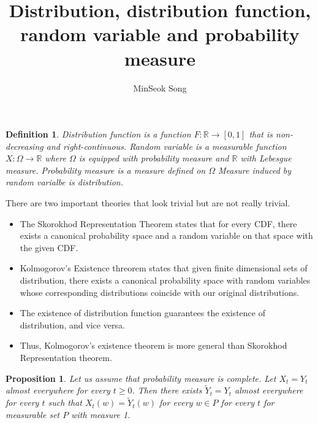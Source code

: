 \documentclass{article}
\title{Distribution, distribution function, random variable and probability measure}
\author{MinSeok Song}
\date{}
\newtheorem{proposition}[theorem]{Proposition}
\newtheorem{definition}{Definition}
\theoremstyle{remark}
\begin{document}
\maketitle
\begin{definition}
    Distribution function is a function $F:\mathbb{R}\to [0,1]$ that is non-decreasing and right-continuous.
    Random variable is a measurable function $X:\Omega\to\mathbb{R}$ where $\Omega$ is equipped with probability measure and $\mathbb{R}$ with Lebesgue measure.
    Probability measure is a measure defined on $\Omega$
    Measure induced by random varialbe is distribution. 
\end{definition}
There are two important theories that look trivial but are not really trivial.
\begin{itemize}
\item The Skorokhod Representation Theorem 
    states that for every CDF, there exists a canonical probability space and a random variable on that space with the given CDF.\\
\item Kolmogorov's Existence threorem states that given finite dimensional sets of distribution, there exists a canonical probability space with random variables whose 
corresponding distributions coincide with our original distributions.
\item The existence of distribution function guarantees the existence of distribution, and vice versa.
\item Thus, Kolmogorov's existence theorem is more general than Skorokhod Representation theorem.
\end{itemize}

\begin{proposition}
    Let us assume that probability measure is complete. Let $X_t=Y_t$ almost everywhere for every $t\geq 0$.
    Then there exists $\tilde{Y}_t=Y_t$ almost everywhere for every $t$ such that $X_t(w)=\tilde{Y}_t(w)$ for every $w\in P$ for every $t$ for 
    measurable set $P$ with measure 1.
\end{proposition}
\end{document}
